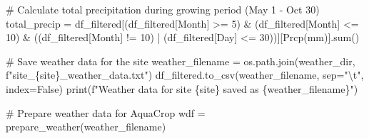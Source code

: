 \documentclass[
  letterpaper,
  DIV=11,
  numbers=noendperiod]{scrartcl}
\newenvironment{Shaded}{\begin{snugshade}}{\end{snugshade}}
\newcommand{\BuiltInTok}[1]{\textcolor[rgb]{0.00,0.23,0.31}{#1}}
\newcommand{\CharTok}[1]{\textcolor[rgb]{0.13,0.47,0.30}{#1}}
\newcommand{\CommentTok}[1]{\textcolor[rgb]{0.37,0.37,0.37}{#1}}
\newcommand{\DecValTok}[1]{\textcolor[rgb]{0.68,0.00,0.00}{#1}}
\newcommand{\NormalTok}[1]{\textcolor[rgb]{0.00,0.23,0.31}{#1}}
\newcommand{\OperatorTok}[1]{\textcolor[rgb]{0.37,0.37,0.37}{#1}}
\newcommand{\SpecialCharTok}[1]{\textcolor[rgb]{0.37,0.37,0.37}{#1}}
\newcommand{\SpecialStringTok}[1]{\textcolor[rgb]{0.13,0.47,0.30}{#1}}
\newcommand{\StringTok}[1]{\textcolor[rgb]{0.13,0.47,0.30}{#1}}
\newcommand{\VariableTok}[1]{\textcolor[rgb]{0.07,0.07,0.07}{#1}}
\begin{document}
\begin{Shaded}
\begin{Highlighting}[]
    \CommentTok{\# Calculate total precipitation during growing period (May 1 {-} Oct 30)}
\NormalTok{    total\_precip }\OperatorTok{=}\NormalTok{ df\_filtered[(df\_filtered[}\StringTok{\textquotesingle{}Month\textquotesingle{}}\NormalTok{] }\OperatorTok{\textgreater{}=} \DecValTok{5}\NormalTok{) }\OperatorTok{\&}\NormalTok{ (df\_filtered[}\StringTok{\textquotesingle{}Month\textquotesingle{}}\NormalTok{] }\OperatorTok{\textless{}=} \DecValTok{10}\NormalTok{) }\OperatorTok{\&}
\NormalTok{                               ((df\_filtered[}\StringTok{\textquotesingle{}Month\textquotesingle{}}\NormalTok{] }\OperatorTok{!=} \DecValTok{10}\NormalTok{) }\OperatorTok{|}\NormalTok{ (df\_filtered[}\StringTok{\textquotesingle{}Day\textquotesingle{}}\NormalTok{] }\OperatorTok{\textless{}=} \DecValTok{30}\NormalTok{))][}\StringTok{\textquotesingle{}Prcp(mm)\textquotesingle{}}\NormalTok{].}\BuiltInTok{sum}\NormalTok{()}

    \CommentTok{\# Save weather data for the site}
\NormalTok{    weather\_filename }\OperatorTok{=}\NormalTok{ os.path.join(weather\_dir, }\SpecialStringTok{f"site\_}\SpecialCharTok{\{}\NormalTok{site}\SpecialCharTok{\}}\SpecialStringTok{\_weather\_data.txt"}\NormalTok{)}
\NormalTok{    df\_filtered.to\_csv(weather\_filename, sep}\OperatorTok{=}\StringTok{"}\CharTok{\textbackslash{}t}\StringTok{"}\NormalTok{, index}\OperatorTok{=}\VariableTok{False}\NormalTok{)}
    \BuiltInTok{print}\NormalTok{(}\SpecialStringTok{f"Weather data for site }\SpecialCharTok{\{}\NormalTok{site}\SpecialCharTok{\}}\SpecialStringTok{ saved as }\SpecialCharTok{\{}\NormalTok{weather\_filename}\SpecialCharTok{\}}\SpecialStringTok{"}\NormalTok{)}

    \CommentTok{\# Prepare weather data for AquaCrop}
\NormalTok{    wdf }\OperatorTok{=}\NormalTok{ prepare\_weather(weather\_filename)}


\end{Highlighting}
\end{Shaded}
\end{document}
